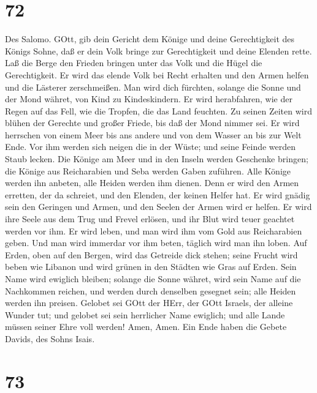 \hypertarget{section-71}{%
\section{72}\label{section-71}}

 Des Salomo. GOtt, gib dein Gericht dem Könige und deine
Gerechtigkeit des Königs Sohne,  daß er dein Volk bringe zur
Gerechtigkeit und deine Elenden rette.  Laß die Berge den
Frieden bringen unter das Volk und die Hügel die Gerechtigkeit.
 Er wird das elende Volk bei Recht erhalten und den Armen
helfen und die Lästerer zerschmeißen.  Man wird dich
fürchten, solange die Sonne und der Mond währet, von Kind zu
Kindeskindern.  Er wird herabfahren, wie der Regen auf das
Fell, wie die Tropfen, die das Land feuchten.  Zu seinen
Zeiten wird blühen der Gerechte und großer Friede, bis daß der Mond
nimmer sei.  Er wird herrschen von einem Meer bis ans andere
und von dem Wasser an bis zur Welt Ende.  Vor ihm werden
sich neigen die in der Wüste; und seine Feinde werden Staub lecken.
 Die Könige am Meer und in den Inseln werden Geschenke
bringen; die Könige aus Reicharabien und Seba werden Gaben zuführen.
 Alle Könige werden ihn anbeten, alle Heiden werden ihm
dienen.  Denn er wird den Armen erretten, der da schreiet,
und den Elenden, der keinen Helfer hat.  Er wird gnädig
sein den Geringen und Armen, und den Seelen der Armen wird er helfen.
 Er wird ihre Seele aus dem Trug und Frevel erlösen, und
ihr Blut wird teuer geachtet werden vor ihm.  Er wird
leben, und man wird ihm vom Gold aus Reicharabien geben. Und man wird
immerdar vor ihm beten, täglich wird man ihn loben.  Auf
Erden, oben auf den Bergen, wird das Getreide dick stehen; seine Frucht
wird beben wie Libanon und wird grünen in den Städten wie Gras auf
Erden.  Sein Name wird ewiglich bleiben; solange die Sonne
währet, wird sein Name auf die Nachkommen reichen, und werden durch
denselben gesegnet sein; alle Heiden werden ihn preisen. 
Gelobet sei GOtt der HErr, der GOtt Israels, der alleine Wunder tut;
 und gelobet sei sein herrlicher Name ewiglich; und alle
Lande müssen seiner Ehre voll werden! Amen, Amen.  Ein Ende
haben die Gebete Davids, des Sohns Isais.

\hypertarget{section-72}{%
\section{73}\label{section-72}}

